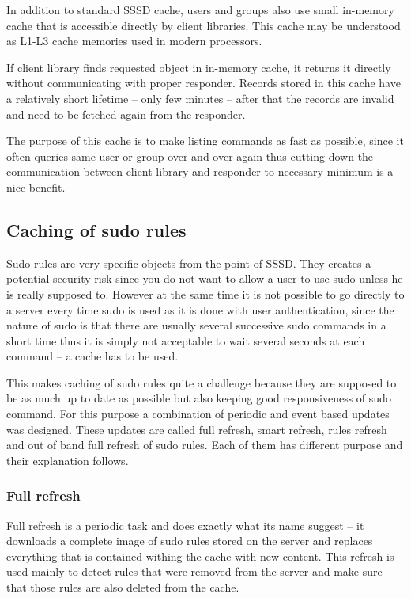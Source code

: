 In addition to standard SSSD cache, users and groups also use small in-memory
cache that is accessible directly by client libraries. This cache may be
understood as L1-L3 cache memories used in modern processors.

If client library finds requested object in in-memory cache, it returns it
directly without communicating with proper responder. Records stored in
this cache have a relatively short lifetime -- only few minutes -- after that
the records are invalid and need to be fetched again from the responder.

The purpose of this cache is to make listing commands as fast as possible,
since it often queries same user or group over and over again thus cutting down
the communication between client library and responder to necessary minimum is
a nice benefit.

\subsection{Caching of sudo rules}
\label{sssd:cache:sudo}

Sudo rules are very specific objects from the point of SSSD. They creates a
potential security risk since you do not want to allow a user to use sudo unless
he is really supposed to. However at the same time it is not possible to go
directly to a server every time sudo is used as it is done with user
authentication, since the nature of sudo is that there are usually several
successive sudo commands in a short time thus it is simply not acceptable to
wait several seconds at each command -- a cache has to be used.

This makes caching of sudo rules quite a challenge because they are supposed to
be as much up to date as possible but also keeping good responsiveness of sudo
command. For this purpose a combination of periodic and event based updates
was designed. These updates are called full refresh, smart refresh, rules
refresh and out of band full refresh of sudo rules. Each of them has different
purpose and their explanation follows.

\subsubsection{Full refresh}
\label{sssd:cache:sudo:full}

Full refresh is a periodic task and does exactly what its name suggest -- it
downloads a complete image of sudo rules stored on the server and replaces
everything that is contained withing the cache with new content. This refresh is
used mainly to detect rules that were removed from the server and make sure
that those rules are also deleted from the cache.

